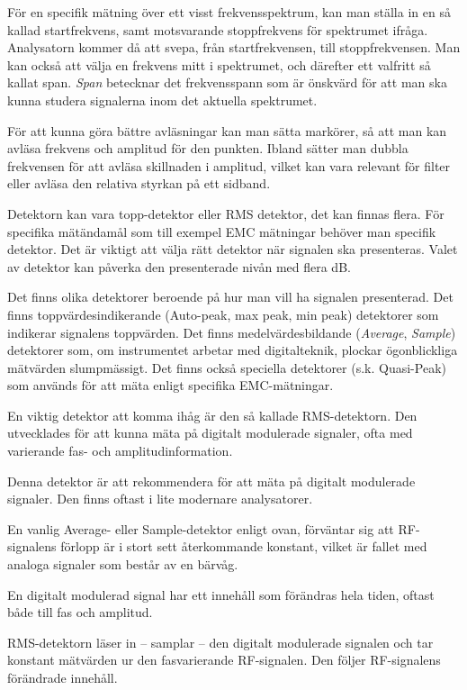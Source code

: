 För en specifik mätning över ett visst frekvensspektrum, kan man ställa in en
så kallad startfrekvens, samt motsvarande stoppfrekvens för spektrumet ifråga.
Analysatorn kommer då att svepa, från startfrekvensen, till stoppfrekvensen.
Man kan också att välja en frekvens mitt i spektrumet, och därefter ett
valfritt så kallat span.
\emph{Span} betecknar det frekvensspann som är önskvärd för att man ska
kunna studera signalerna inom det aktuella spektrumet.

För att kunna göra bättre avläsningar kan man sätta markörer, så att man kan
avläsa frekvens och amplitud för den punkten.
Ibland sätter man dubbla frekvensen för att avläsa skillnaden i amplitud,
vilket kan vara relevant för filter eller avläsa den relativa styrkan på ett
sidband.

Detektorn kan vara topp-detektor eller RMS detektor, det kan finnas flera.
För specifika mätändamål som till exempel EMC mätningar behöver man specifik detektor.
Det är viktigt att välja rätt detektor när signalen ska presenteras.
Valet av detektor kan påverka den presenterade nivån med flera dB.

Det finns olika detektorer beroende på hur man vill ha signalen presenterad.
Det finns toppvärdesindikerande (Auto-peak, max peak, min peak) detektorer som
indikerar signalens toppvärden.
Det finns medelvärdesbildande (\emph{Average}, \emph{Sample}) detektorer som, om
instrumentet arbetar med digitalteknik, plockar ögonblickliga mätvärden
slumpmässigt.
Det finns också speciella detektorer (s.k. Quasi-Peak) som används för att
mäta enligt specifika EMC-mätningar.

En viktig detektor att komma ihåg är den så kallade RMS-detektorn.
Den utvecklades för att kunna mäta på digitalt modulerade signaler, ofta med
varierande fas- och amplitudinformation.

Denna detektor är att rekommendera för att mäta på digitalt modulerade signaler.
Den finns oftast i lite modernare analysatorer.

En vanlig Average- eller Sample-detektor enligt ovan, förväntar sig att
RF-signalens förlopp är  i stort sett återkommande konstant, vilket är fallet
med analoga signaler som består av en bärvåg.

En digitalt modulerad signal har ett innehåll som förändras hela tiden, oftast
både till fas och amplitud.

RMS-detektorn läser in -- samplar -- den digitalt modulerade signalen och tar
konstant mätvärden ur den fasvarierande RF-signalen.
Den följer RF-signalens förändrade innehåll.

